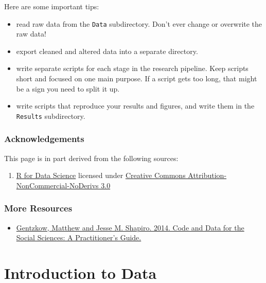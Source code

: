 \documentclass[]{book}
\providecommand{\tightlist}{%
  \setlength{\itemsep}{0pt}\setlength{\parskip}{0pt}}
\begin{document}
Here are some important tips:

\begin{itemize}
\tightlist
\item
  read raw data from the \texttt{Data} subdirectory. Don't ever change
  or overwrite the raw data!
\item
  export cleaned and altered data into a separate directory.
\item
  write separate scripts for each stage in the research pipeline. Keep
  scripts short and focused on one main purpose. If a script gets too
  long, that might be a sign you need to split it up.
\item
  write scripts that reproduce your results and figures, and write them
  in the \texttt{Results} subdirectory.
\end{itemize}

\subsubsection*{Acknowledgements}\label{acknowledgements}

This page is in part derived from the following sources:

\begin{enumerate}
\def\labelenumi{\arabic{enumi}.}
\tightlist
\item
  \href{https://r4ds.had.co.nz}{R for Data Science} licensed under
  \href{https://creativecommons.org/licenses/by-nc-nd/3.0/us/}{Creative
  Commons Attribution-NonCommercial-NoDerivs 3.0}
\end{enumerate}

\subsubsection*{More Resources}\label{more-resources}

\begin{itemize}
\tightlist
\item
  \href{https://web.stanford.edu/~gentzkow/research/CodeAndData.pdf}{Gentzkow,
  Matthew and Jesse M. Shapiro. 2014. Code and Data for the Social
  Sciences: A Practitioner's Guide.}
\end{itemize}

\section{Introduction to Data}\label{introduction-to-data}
\end{document}
